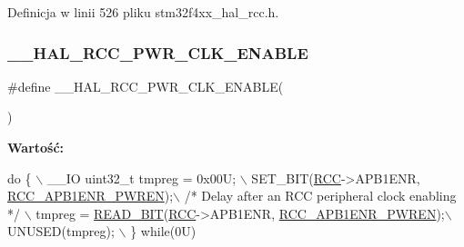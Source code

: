 Definicja w linii 526 pliku stm32f4xx\+\_\+hal\+\_\+rcc.\+h.

\mbox{\label{group___r_c_c___a_p_b1___clock___enable___disable_ga6c7399cc977622172aeda52a86ceed92}} 
\subsubsection{\texorpdfstring{\+\_\+\+\_\+\+H\+A\+L\+\_\+\+R\+C\+C\+\_\+\+P\+W\+R\+\_\+\+C\+L\+K\+\_\+\+E\+N\+A\+B\+LE}{\_\_HAL\_RCC\_PWR\_CLK\_ENABLE}}
{\footnotesize\ttfamily \#define \+\_\+\+\_\+\+H\+A\+L\+\_\+\+R\+C\+C\+\_\+\+P\+W\+R\+\_\+\+C\+L\+K\+\_\+\+E\+N\+A\+B\+LE(\begin{DoxyParamCaption}{ }\end{DoxyParamCaption})}

{\bfseries Wartość\+:}
\begin{DoxyCode}
\textcolor{keywordflow}{do} \{ \(\backslash\)
                                        \_\_IO uint32\_t tmpreg = 0x00U; \(\backslash\)
                                        SET\_BIT(\hyperlink{group___peripheral__declaration_ga74944438a086975793d26ae48d5882d4}{RCC}->APB1ENR, 
      \hyperlink{group___peripheral___registers___bits___definition_ga5c19997ccd28464b80a7c3325da0ca60}{RCC\_APB1ENR\_PWREN});\(\backslash\)
                                        \textcolor{comment}{/* Delay after an RCC peripheral clock enabling */} \(\backslash\)
                                        tmpreg = \hyperlink{group___exported__macro_ga822bb1bb9710d5f2fa6396b84e583c33}{READ\_BIT}(\hyperlink{group___peripheral__declaration_ga74944438a086975793d26ae48d5882d4}{RCC}->APB1ENR, 
      \hyperlink{group___peripheral___registers___bits___definition_ga5c19997ccd28464b80a7c3325da0ca60}{RCC\_APB1ENR\_PWREN});\(\backslash\)
                                        UNUSED(tmpreg); \(\backslash\)
                                          \} \textcolor{keywordflow}{while}(0U)
\end{DoxyCode}


